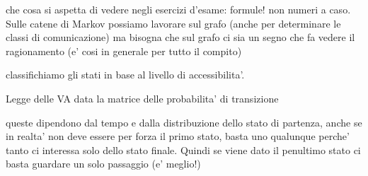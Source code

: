 che cosa si aspetta di vedere negli esercizi d'esame: formule! non numeri a caso. Sulle catene di Markov possiamo lavorare sul grafo (anche per determinare le classi di comunicazione) ma bisogna che sul grafo ci sia un segno che fa vedere il ragionamento (e' cosi in generale per tutto il compito)

classifichiamo gli stati in base al livello di accessibilita'. 

Legge delle VA data la matrice delle probabilita' di transizione

queste dipendono dal tempo e dalla distribuzione dello stato di partenza, anche se in realta' non deve essere per forza il primo stato, basta uno qualunque perche' tanto ci interessa solo dello stato finale. Quindi se viene dato il penultimo stato ci basta guardare un solo passaggio (e' meglio!)

% 
